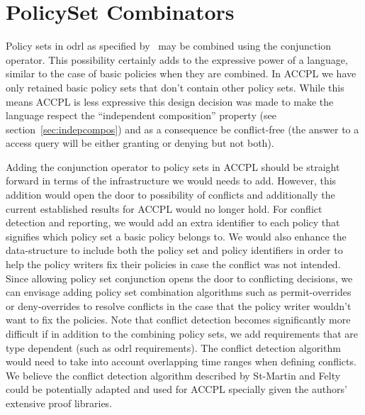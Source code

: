 \section{PolicySet Combinators}\label{sec:policysetcombo}

Policy sets in \ac{odrl} as specified by~\cite{pucella2006} may be combined using the conjunction operator. This possibility certainly adds to the expressive power of a language, similar to the case of basic policies when they are combined. In \ac{ACCPL} we have only retained basic policy sets that don't contain other policy sets. While this means \ac{ACCPL} is less expressive this design decision was made to make the language respect the ``independent composition'' property (see section~\ref{sec:indepcompos}) and as a consequence be conflict-free (the answer to a access query will be either granting or denying but not both). 

Adding the conjunction operator to policy sets in \ac{ACCPL} should be straight forward in terms of the infrastructure we would needs to add. However, this addition would open the door to possibility of conflicts and additionally the current established results for \ac{ACCPL} would no longer hold. For conflict detection and reporting, we would add an extra identifier to each policy that signifies which policy set a basic policy belongs to. We would also enhance the  data-structure to include both the policy set and policy identifiers in order to help the policy writers fix their policies in case the conflict was not intended. Since allowing policy set conjunction opens the door to conflicting decisions, we can envisage adding policy set combination algorithms such as permit-overrides or deny-overrides to resolve conflicts in the case that the policy writer wouldn't want to fix the policies. Note that conflict detection becomes significantly more difficult if in addition to the combining policy sets, we add requirements that are type dependent (such as \ac{odrl} requirements). The conflict detection algorithm would need to take into account overlapping time ranges when defining conflicts. We believe the conflict detection algorithm described by St-Martin and Felty~\cite{felty16} could be potentially adapted and used for \ac{ACCPL} specially given the authors' extensive proof libraries. 

